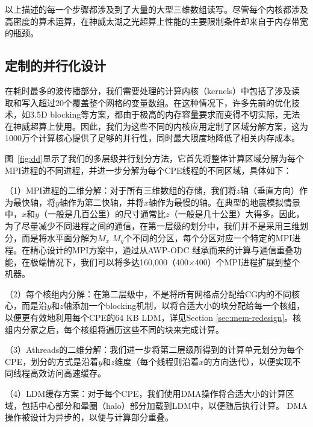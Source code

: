 \documentclass[degree=doctor]{thuthesis}
\begin{document}
以上描述的每一个步骤都涉及到了大量的大型三维数组读写。尽管每个内核都涉及高密度的算术运算，在神威太湖之光超算上性能的主要限制条件却来自于内存带宽的瓶颈。

\subsection{定制的并行化设计}
\label{sec:parallel}

在耗时最多的波传播部分，我们需要处理的计算内核（kernels）中包括了涉及读取和写入超过20个覆盖整个网格的变量数组。在这种情况下，许多先前的优化技术，如3.5D blocking等方案\citep {nguyen20103}，都由于极高的内存容量要求而变得不切实际，无法在神威超算上使用。因此，我们为这些不同的内核应用定制了区域分解方案，这为1000万个计算核心提供了足够的并行性，同时最大限度地降低了相关内存成本。

图~\ref{fig:dd}显示了我们的多层级并行划分方法，它首先将整体计算区域分解为每个MPI进程的不同进程，并进一步分解为每个CPE线程的不同区域，具体如下：

（1）MPI进程的二维分解：对于所有三维数组的存储，我们将$ z $轴（垂直方向）作为最快轴，将$ y $轴作为第二快轴，并将$ x $轴作为最慢的轴。在典型的地震模拟情景中，$ x $和$ y $（一般是几百公里）的尺寸通常比$ z $（一般是几十公里）大得多。因此，为了尽量减少不同进程之间的通信，在第一层级的划分中，我们并不是采用三维划分，而是将水平面分解为$ M_x $ $ M_y $个不同的分区，每个分区对应一个特定的MPI进程。在精心设计的MPI方案中，通过从AWP-ODC \citep{cui2010scalable}继承而来的计算与通信重叠功能，在极端情况下，我们可以将多达160,000（400×400）个MPI进程扩展到整个机器。

（2）每个核组内分解：在第二层级中，不是将所有网格点分配给CG内的不同核心，而是沿$ y $和$ z $轴添加一个blocking机制，以将合适大小的块分配给每一个核组，以便更有效地利用每个CPE的64 KB LDM，详见Section \ref{sec:mem-redesign}。核组内分家之后，每个核组将遍历这些不同的块来完成计算。

（3）Athreads的二维分解：我们进一步将第二层级所得到的计算单元划分为每个CPE，划分的方式是沿着$ y $和$ z $维度（每个线程则沿着$ x $的方向迭代），以便实现不同线程高效访问高速缓存。

（4）LDM缓存方案：对于每个CPE，我们使用DMA操作将合适大小的计算区域，包括中心部分和晕圈（halo）部分加载到LDM中，以便随后执行计算。 DMA操作被设计为异步的，以便与计算部分重叠。
\end{document}
